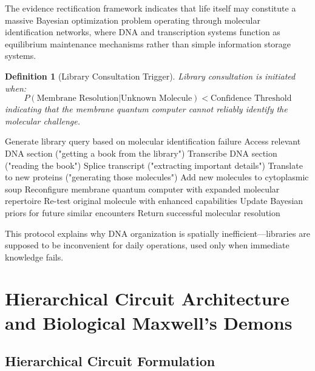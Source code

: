 \documentclass[12pt,a4paper]{article}
\newtheorem{definition}[theorem]{Definition}
\begin{document}
The evidence rectification framework indicates that life itself may constitute a massive Bayesian optimization problem operating through molecular identification networks, where DNA and transcription systems function as equilibrium maintenance mechanisms rather than simple information storage systems.

\begin{definition}[Library Consultation Trigger]
Library consultation is initiated when:
\begin{equation}
P(\text{Membrane Resolution}|\text{Unknown Molecule}) < \text{Confidence Threshold}
\end{equation}
indicating that the membrane quantum computer cannot reliably identify the molecular challenge.
\end{definition}

\begin{algorithm}
\caption{DNA Library Emergency Resolution Protocol}
\begin{algorithmic}
    \State Generate library query based on molecular identification failure
    \State Access relevant DNA section ("getting a book from the library")
    \State Transcribe DNA section ("reading the book")
    \State Splice transcript ("extracting important details")
    \State Translate to new proteins ("generating those molecules")
    \State Add new molecules to cytoplasmic soup
    \State Reconfigure membrane quantum computer with expanded molecular repertoire
    \State Re-test original molecule with enhanced capabilities
    \State Update Bayesian priors for future similar encounters
    \State Return successful molecular resolution
\EndProcedure
\end{algorithmic}
\end{algorithm}

This protocol explains why DNA organization is spatially inefficient—libraries are supposed to be inconvenient for daily operations, used only when immediate knowledge fails.

\section{Hierarchical Circuit Architecture and Biological Maxwell's Demons}

\subsection{Hierarchical Circuit Formulation}
\end{document}
